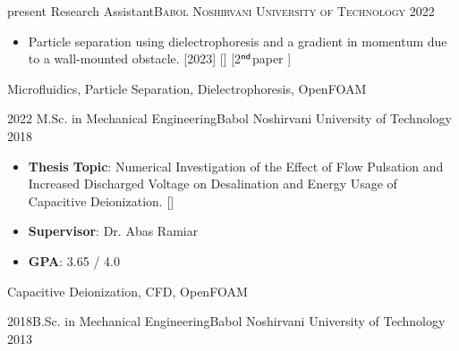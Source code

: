   \shorthandoff{:}

\begin{experiences}
  \experience
  {present}   {Research Assistant}{\normalfont\textsc{\small Babol Noshirvani University of Technology}}
  {2022} {
    \begin{itemize}
      \item Particle separation using dielectrophoresis and a gradient in momentum due to a wall-mounted obstacle. [2023] [] [2$^{\sf{nd}}$\thinspace paper \hyperref[pub:derakhshan2023]{\color{linkcolor}{\footnotesize \kern-.4ex\raisebox{+.48ex}\faLevelDown}}]
    \end{itemize}
  }
  {Microfluidics, Particle Separation, Dielectrophoresis, OpenFOAM}
\end{experiences}

\vspace{-3pt}

\begin{experiences}
  \experience
  {2022}   {M.Sc. in Mechanical Engineering}{Babol Noshirvani University of Technology}
  {2018} {
    \begin{itemize}
      \item \textbf{Thesis Topic}: Numerical Investigation of the Effect of Flow Pulsation and Increased Discharged Voltage on Desalination and Energy Usage of Capacitive Deionization. []\\[2pt]
      \item \textbf{Supervisor}: Dr. Abas Ramiar {\hyperref[recom:ramiar]{\color{linkcolor}{\footnotesize \kern-.4ex\raisebox{+.48ex}\faLevelDown}}}
      \item \textbf{GPA}: 3.65 / 4.0
      \vspace{3pt}
    \end{itemize}
  }
  {Capacitive Deionization, CFD, OpenFOAM}
\end{experiences}

\vspace{-10pt}


\begin{experiences}
  \experienceLite
  {2018}{B.Sc. in Mechanical Engineering}{Babol Noshirvani University of Technology}
  {2013}
\end{experiences}



  \shorthandon{:}
\vspace{2pt}
